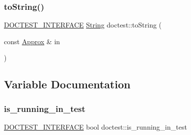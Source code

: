 \mbox{\label{namespacedoctest_a63aa06a8555c5aa34a7a6e76e87a3bca}} 
\subsubsection{\texorpdfstring{to\+String()}{toString()}\hspace{0.1cm}{\footnotesize\ttfamily [18/18]}}
{\footnotesize\ttfamily \hyperlink{doctest_8h_a9c16ffc635ec47f07797d21ede26b1a5}{D\+O\+C\+T\+E\+S\+T\+\_\+\+I\+N\+T\+E\+R\+F\+A\+CE} \hyperlink{classdoctest_1_1_string}{String} doctest\+::to\+String (\begin{DoxyParamCaption}\item[{const \hyperlink{classdoctest_1_1_approx}{Approx} \&}]{in }\end{DoxyParamCaption})}



\subsection{Variable Documentation}
\mbox{\label{namespacedoctest_a0b03060093b3894c976b6ae84e55f3f2}} 
\subsubsection{\texorpdfstring{is\+\_\+running\+\_\+in\+\_\+test}{is\_running\_in\_test}}
{\footnotesize\ttfamily \hyperlink{doctest_8h_a9c16ffc635ec47f07797d21ede26b1a5}{D\+O\+C\+T\+E\+S\+T\+\_\+\+I\+N\+T\+E\+R\+F\+A\+CE} bool doctest\+::is\+\_\+running\+\_\+in\+\_\+test}

